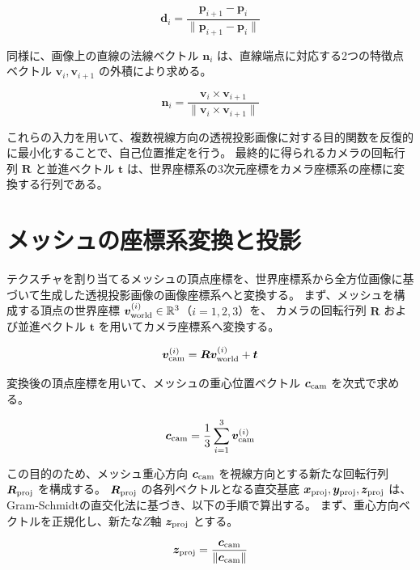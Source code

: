 \begin{equation}
  \bm{d}_i = \frac{\bm{p}_{i+1} - \bm{p}_i}{\|\bm{p}_{i+1} - \bm{p}_i\|}
\end{equation}

同様に、画像上の直線の法線ベクトル $\bm{n}_i$ は、直線端点に対応する2つの特徴点ベクトル $\bm{v}_i, \bm{v}_{i+1}$ の外積により求める。

\begin{equation}
  \bm{n}_i = \frac{\bm{v}_i \times \bm{v}_{i+1}}{\|\bm{v}_i \times \bm{v}_{i+1}\|}
\end{equation}

これらの入力を用いて、複数視線方向の透視投影画像に対する目的関数を反復的に最小化することで、自己位置推定を行う。
最終的に得られるカメラの回転行列 $\bm{R}$ と並進ベクトル $\bm{t}$ は、世界座標系の3次元座標をカメラ座標系の座標に変換する行列である。


\section{メッシュの座標系変換と投影}

テクスチャを割り当てるメッシュの頂点座標を、世界座標系から全方位画像に基づいて生成した透視投影画像の画像座標系へと変換する。
まず、メッシュを構成する頂点の世界座標 $\bm{v}_{\rm world}^{(i)} \in \mathbb{R}^3$（$i=1,2,3$）を、
カメラの回転行列 $\bm{R}$ および並進ベクトル $\bm{t}$ を用いてカメラ座標系へ変換する。

\begin{equation}
  \bm{v}_{\rm cam}^{(i)} = \bm{R}\bm{v}_{\rm world}^{(i)} + \bm{t}
\end{equation}

変換後の頂点座標を用いて、メッシュの重心位置ベクトル $\bm{c}_{\rm cam}$ を次式で求める。

\begin{equation}
  \bm{c}_{\rm cam} = \frac{1}{3} \sum_{i=1}^{3} \bm{v}_{\rm cam}^{(i)}
\end{equation}

この目的のため、メッシュ重心方向 $\bm{c}_{\rm cam}$ を視線方向とする新たな回転行列 $\bm{R}_{\rm proj}$ を構成する。
$\bm{R}_{\rm proj}$ の各列ベクトルとなる直交基底 $\bm{x}_{\rm proj}, \bm{y}_{\rm proj}, \bm{z}_{\rm proj}$ は、
Gram-Schmidtの直交化法に基づき、以下の手順で算出する。
まず、重心方向ベクトルを正規化し、新たな$Z$軸 $\bm{z}_{\rm proj}$ とする。

\begin{equation}
  \bm{z}_{\rm proj} = \frac{\bm{c}_{\rm cam}}{\|\bm{c}_{\rm cam}\|}
\end{equation}

